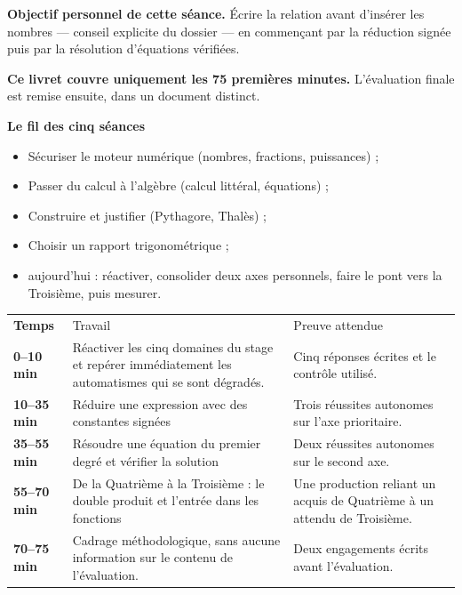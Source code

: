 \documentclass[10pt,a4paper]{article}
\begin{document}
\begin{goalbox}
\textbf{Objectif personnel de cette séance.} Écrire la relation avant d'insérer les nombres — conseil explicite du dossier — en commençant par la réduction signée puis par la résolution d'équations vérifiées.
\par\medskip
\textbf{Ce livret couvre uniquement les 75 premières minutes.} L'évaluation finale est remise ensuite, dans un document distinct.
\end{goalbox}
\begin{methodbox}
\textbf{Le fil des cinq séances}
\begin{itemize}[leftmargin=13mm,labelsep=3mm,itemsep=1.5pt]
\item[\textbf{\color{Navy}S1}] Sécuriser le moteur numérique (nombres, fractions, puissances) ;
\item[\textbf{\color{Navy}S2}] Passer du calcul à l'algèbre (calcul littéral, équations) ;
\item[\textbf{\color{Navy}S3}] Construire et justifier (Pythagore, Thalès) ;
\item[\textbf{\color{Navy}S4}] Choisir un rapport trigonométrique ;
\item[\textbf{\color{Navy}S5}] aujourd'hui : réactiver, consolider deux axes personnels, faire le pont vers la Troisième, puis mesurer.
\end{itemize}
\end{methodbox}
\par\noindent\begin{tabularx}{\linewidth}{>{\bfseries}p{20mm} X X}
\rowcolor{Navy}\color{white}Temps & \color{white}Travail & \color{white}Preuve attendue \\
0--10 min & Réactiver les cinq domaines du stage et repérer immédiatement les automatismes qui se sont dégradés. & Cinq réponses écrites et le contrôle utilisé. \\
10--35 min & Réduire une expression avec des constantes signées & Trois réussites autonomes sur l'axe prioritaire. \\
35--55 min & Résoudre une équation du premier degré et vérifier la solution & Deux réussites autonomes sur le second axe. \\
55--70 min & De la Quatrième à la Troisième : le double produit et l'entrée dans les fonctions & Une production reliant un acquis de Quatrième à un attendu de Troisième. \\
70--75 min & Cadrage méthodologique, sans aucune information sur le contenu de l'évaluation. & Deux engagements écrits avant l'évaluation. \\
\end{tabularx}
\end{document}
